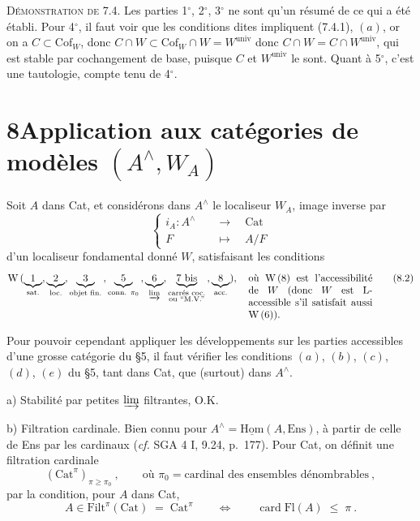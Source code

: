 \documentclass[11pt]{article}
\newcommand{\printedpage}[1]{\marginpar{\footnotesize p.~#1}}
\newcommand{\msp}[1]{\marginpar{\footnotesize [#1]}}
\newcommand{\Fl}{\mathrm{Fl}}
\newcommand{\Cof}{\mathrm{Cof}}
\newcommand{\Cat}{\mathrm{Cat}}
\newcommand{\univ}{\mathrm{univ}}
\newcommand{\chap}{^{\wedge}}
\begin{document}
\textsc{Démonstration de} 7.4. Les parties 1$^\circ$, 2$^\circ$, 3$^\circ$ ne sont qu'un résumé de ce qui a été établi. Pour 4$^\circ$, il faut voir que les conditions dites impliquent (7.4.1), $(a)$, or on a $C\subset \Cof_W$, donc $C\cap W\subset \Cof_W\cap W = W^{\univ}$
\msp{page 100}
donc $C\cap W = C\cap W^{\univ}$, qui est stable par cochangement de base, puisque $C$ et $W^{\univ}$ le sont. Quant à 5$^\circ$, c'est une tautologie, compte tenu de 4$^\circ$.

\section*{8\quad Application aux catégories de modèles $(A\chap,W_A)$}

Soit $A$ dans Cat, et considérons dans $A\chap$ le localiseur $W_A$, image inverse par
\[
\left\{
\begin{aligned}
i_A : A\chap \quad &\longrightarrow \quad \Cat\\
F \quad &\longmapsto \quad A/F
\end{aligned}
\right.
\tag*{(8.1)}
\]
d'un localiseur fondamental donné $W$, satisfaisant les conditions
\[
\mathrm{W}\,(\underbrace{1}_{\text{sat.}},\underbrace{2}_{\text{loc.}},\underbrace{3}_{\text{objet fin.}}\,,\underbrace{5}_{\text{conn. }\pi_0}\,,\underbrace{6}_{\varinjlim},\underbrace{7\text{ bis}}_{\substack{\text{carrés coc.}\\ \text{ou ``M.V.''}}}\,,\underbrace{8}_{\text{acc.}}),\quad
\text{\parbox[t]{4.3cm}{où W\,(8) est l'accessibilité de $W$ (donc $W$ est L-accessible s'il satisfait aussi W\,(6)).}}
\tag*{(8.2)}
\]

Pour pouvoir cependant appliquer les développements sur les parties accessibles d'une grosse catégorie du §5, il faut vérifier les conditions $(a)$, $(b)$, $(c)$, $(d)$, $(e)$ du §5, tant dans Cat, que (surtout) dans $A\chap$.

a) Stabilité par petites $\varinjlim$ filtrantes, O.K.

b) Filtration cardinale. Bien connu pour $A\chap = \underline{\mathrm{Hom}}(A,\mathrm{Ens})$, à partir de celle de Ens par les cardinaux (\textit{cf.} SGA 4 I, 9.24, p.~177). Pour Cat, on définit une filtration cardinale
\[
(\Cat^{\pi})_{\pi\geq\pi_0}\ , \qquad \text{où } \pi_0 = \text{cardinal des ensembles dénombrables}\ ,
\tag*{(8.3)}
\]
\printedpage{56}
\msp{page 101}
par la condition, pour $A$ dans Cat,
\[
A\in \mathrm{Filt}^{\pi}(\Cat) \;=\; \Cat^{\pi} \qquad\Longleftrightarrow\qquad \operatorname{card}\Fl(A) \;\leq\; \pi\ .
\tag*{(8.4)}
\]
\end{document}
